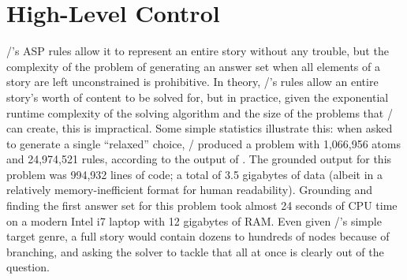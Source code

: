 \section{High-Level Control}
\label{sec:dunyazad-control}%

\dunyazad/'s ASP rules allow it to represent an entire story without any trouble, but the complexity of the problem of generating an answer set when all elements of a story are left unconstrained is prohibitive.
%
In theory, \dunyazad/'s rules allow an entire story's worth of content to be solved for, but in practice, given the exponential runtime complexity of the solving algorithm and the size of the problems that \dunyazad/ can create, this is impractical.
%
Some simple statistics illustrate this: when asked to generate a single ``relaxed'' choice, \dunyazad/ produced a problem with 1,066,956 atoms and 24,974,521 rules, according to the output of .
%
The grounded output for this problem was 994,932 lines of code; a total of 3.5 gigabytes of data (albeit in a relatively memory-inefficient format for human readability).
%
Grounding and finding the first answer set for this problem took almost 24 seconds of CPU time on a modern Intel i7 laptop with 12 gigabytes of RAM.
%
Even given \dunyazad/'s simple target genre, a full story would contain dozens to hundreds of nodes because of branching, and asking the solver to tackle that all at once is clearly out of the question.


